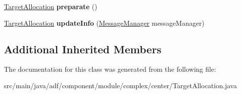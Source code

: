 \begin{DoxyCompactItemize}
\item 
\hypertarget{classadf_1_1component_1_1module_1_1complex_1_1center_1_1TargetAllocation_aee502199de740680e044fa0f52f00b17}{}\label{classadf_1_1component_1_1module_1_1complex_1_1center_1_1TargetAllocation_aee502199de740680e044fa0f52f00b17} 
\hyperlink{classadf_1_1component_1_1module_1_1complex_1_1center_1_1TargetAllocation}{Target\+Allocation} {\bfseries preparate} ()
\item 
\hypertarget{classadf_1_1component_1_1module_1_1complex_1_1center_1_1TargetAllocation_a06cb13395e25a124c011b39beeebdee0}{}\label{classadf_1_1component_1_1module_1_1complex_1_1center_1_1TargetAllocation_a06cb13395e25a124c011b39beeebdee0} 
\hyperlink{classadf_1_1component_1_1module_1_1complex_1_1center_1_1TargetAllocation}{Target\+Allocation} {\bfseries update\+Info} (\hyperlink{classadf_1_1agent_1_1communication_1_1MessageManager}{Message\+Manager} message\+Manager)
\end{DoxyCompactItemize}
\subsection*{Additional Inherited Members}


The documentation for this class was generated from the following file\+:\begin{DoxyCompactItemize}
\item 
src/main/java/adf/component/module/complex/center/Target\+Allocation.\+java\end{DoxyCompactItemize}
